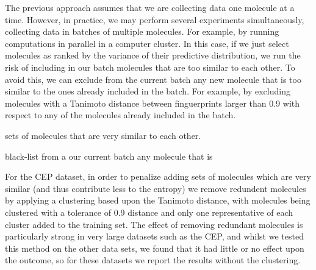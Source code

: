 The previous approach assumes that we are collecting data one molecule at a time. However, in practice, we may perform several experiments simultaneously, collecting data in batches of multiple molecules. For example, by running computations in parallel in a computer cluster. In this case, if we just select molecules as ranked by the variance of their predictive distribution, we run the risk of including in our batch molecules that are too similar to each other. To avoid this, we can exclude from the current batch any new molecule that is too similar to the ones already included in the batch. For example, by excluding molecules with a Tanimoto distance between finguerprints larger than 0.9 with respect to any of the molecules already included in the batch.

sets of molecules that are very similar to each other.

black-list from a our current batch any molecule that is 


For the CEP dataset, in order to penalize adding sets of molecules which are very similar (and thus contribute less to the entropy) we remove redundent molecules by applying a clustering based upon the Tanimoto distance, with molecules being clustered with a tolerance of 0.9 distance and only one representative of each cluster added to the training set.  The effect of removing redundant molecules is particularly strong in very large datasets such as the CEP, and whilst we tested this method on the other data sets, we found that it had little or no effect upon the outcome, so for these datasets we report the results without the clustering.